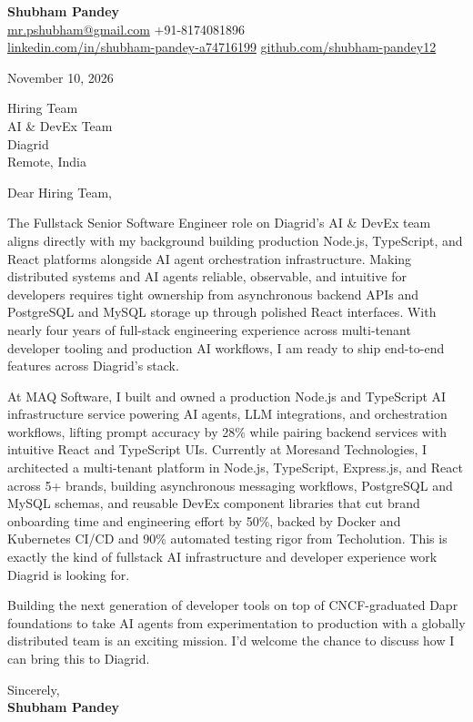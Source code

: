 \documentclass[a4paper,11pt]{article}
\begin{document}
\textbf{\Large Shubham Pandey}\\
\href{mailto:mr.pshubham@gmail.com}{mr.pshubham@gmail.com} \quad +91-8174081896\\
\href{https://www.linkedin.com/in/shubham-pandey-a74716199/}{linkedin.com/in/shubham-pandey-a74716199} \quad
\href{https://github.com/shubham-pandey12}{github.com/shubham-pandey12}

\vspace{1em}
November 10, 2026

\vspace{1em}
Hiring Team\\
AI \& DevEx Team\\
Diagrid\\
Remote, India

\vspace{1em}
Dear Hiring Team,

The Fullstack Senior Software Engineer role on Diagrid's AI \& DevEx team aligns directly with my background building production Node.js, TypeScript, and React platforms alongside AI agent orchestration infrastructure. Making distributed systems and AI agents reliable, observable, and intuitive for developers requires tight ownership from asynchronous backend APIs and PostgreSQL and MySQL storage up through polished React interfaces. With nearly four years of full-stack engineering experience across multi-tenant developer tooling and production AI workflows, I am ready to ship end-to-end features across Diagrid's stack.

At MAQ Software, I built and owned a production Node.js and TypeScript AI infrastructure service powering AI agents, LLM integrations, and orchestration workflows, lifting prompt accuracy by 28\% while pairing backend services with intuitive React and TypeScript UIs. Currently at Moresand Technologies, I architected a multi-tenant platform in Node.js, TypeScript, Express.js, and React across 5+ brands, building asynchronous messaging workflows, PostgreSQL and MySQL schemas, and reusable DevEx component libraries that cut brand onboarding time and engineering effort by 50\%, backed by Docker and Kubernetes CI/CD and 90\% automated testing rigor from Techolution. This is exactly the kind of fullstack AI infrastructure and developer experience work Diagrid is looking for.

Building the next generation of developer tools on top of CNCF-graduated Dapr foundations to take AI agents from experimentation to production with a globally distributed team is an exciting mission. I'd welcome the chance to discuss how I can bring this to Diagrid.

\vspace{1em}
Sincerely,\\[0.5em]
\textbf{Shubham Pandey}
\end{document}
